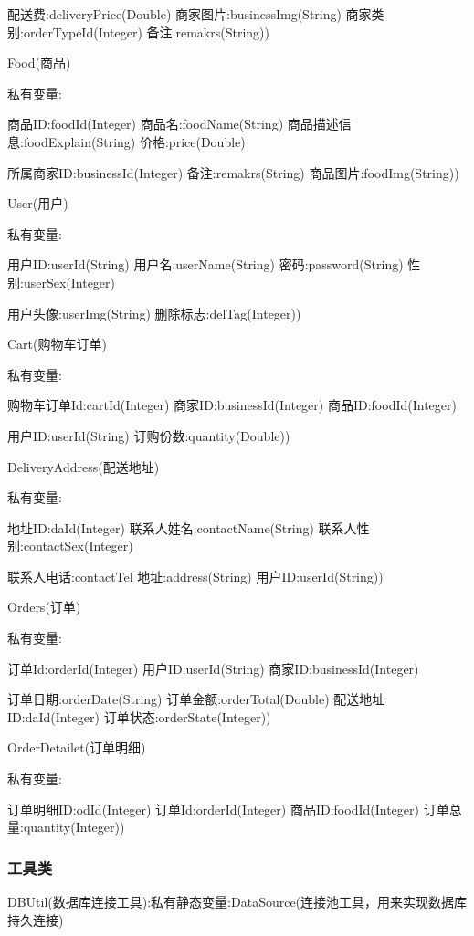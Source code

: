 配送费:deliveryPrice(Double)  商家图片:businessImg(String)  商家类别:orderTypeId(Integer)  备注:remakrs(String))



Food(商品)

私有变量:

商品ID:foodId(Integer)  商品名:foodName(String)  商品描述信息:foodExplain(String)  价格:price(Double)

所属商家ID:businessId(Integer)  备注:remakrs(String)  商品图片:foodImg(String))



User(用户)

私有变量:

用户ID:userId(String)  用户名:userName(String)  密码:password(String)  性别:userSex(Integer)

用户头像:userImg(String)  删除标志:delTag(Integer))



Cart(购物车订单)

私有变量:

购物车订单Id:cartId(Integer)  商家ID:businessId(Integer)  商品ID:foodId(Integer)

用户ID:userId(String)  订购份数:quantity(Double))



DeliveryAddress(配送地址)

私有变量:

地址ID:daId(Integer)  联系人姓名:contactName(String)  联系人性别:contactSex(Integer)


联系人电话:contactTel  地址:address(String)  用户ID:userId(String))



Orders(订单)

私有变量:

订单Id:orderId(Integer)  用户ID:userId(String)  商家ID:businessId(Integer)


订单日期:orderDate(String)  订单金额:orderTotal(Double)  配送地址ID:daId(Integer)  订单状态:orderState(Integer))



OrderDetailet(订单明细)

私有变量:

订单明细ID:odId(Integer)  订单Id:orderId(Integer)  商品ID:foodId(Integer)  订单总量:quantity(Integer))

\subsubsection{工具类}
DBUtil(数据库连接工具):私有静态变量:DataSource(连接池工具，用来实现数据库持久连接)

